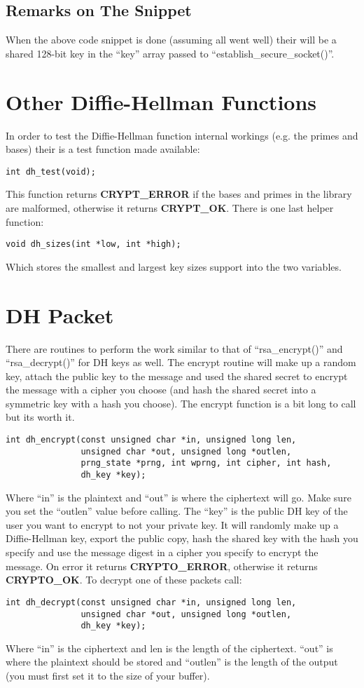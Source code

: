 \documentclass{book}
\begin{document}
\subsection{Remarks on The Snippet}
When the above code snippet is done (assuming all went well) their will be a shared 128-bit key in the ``key'' array
passed to ``establish\_secure\_socket()''.

\section{Other Diffie-Hellman Functions}
In order to test the Diffie-Hellman function internal workings (e.g. the primes and bases) their is a test function made
available:
\begin{verbatim}
int dh_test(void);
\end{verbatim}

This function returns {\bf CRYPT\_ERROR} if the bases and primes in the library are malformed, otherwise it returns
{\bf CRYPT\_OK}.  There is one last helper function:
\begin{verbatim}
void dh_sizes(int *low, int *high);
\end{verbatim}
Which stores the smallest and largest key sizes support into the two variables.

\section{DH Packet}
There are routines to perform the work similar to that of ``rsa\_encrypt()'' and ``rsa\_decrypt()'' for DH keys as well.
The encrypt routine will make up a random key, attach the public key to the message and used the shared secret to encrypt
the message with a cipher you choose (and hash the shared secret into a symmetric key with a hash you choose).  The encrypt
function is a bit long to call but its worth it.
\begin{verbatim}
int dh_encrypt(const unsigned char *in, unsigned long len, 
               unsigned char *out, unsigned long *outlen,
               prng_state *prng, int wprng, int cipher, int hash, 
               dh_key *key);
\end{verbatim}
Where ``in'' is the plaintext and ``out'' is where the ciphertext will go.  Make sure you set the ``outlen'' value before
calling.  The ``key'' is the public DH key of the user you want to encrypt to not your private key.  It will randomly make up
a Diffie-Hellman key, export the public copy, hash the shared key with the hash you specify and use the message digest in a
cipher you specify to encrypt the message.  On error it returns {\bf CRYPTO\_ERROR}, otherwise
it returns {\bf CRYPTO\_OK}.  To decrypt one of these packets call:
\begin{verbatim}
int dh_decrypt(const unsigned char *in, unsigned long len, 
               unsigned char *out, unsigned long *outlen, 
               dh_key *key);
\end{verbatim}
Where ``in'' is the ciphertext and len is the length of the ciphertext.  ``out'' is where the plaintext should be stored
and ``outlen'' is the length of the output (you must first set it to the size of your buffer).  
\end{document}
